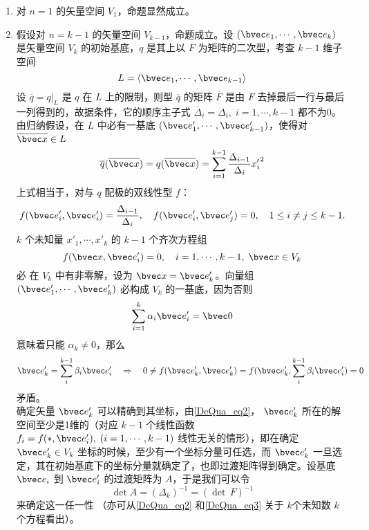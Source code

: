 \begin{enumerate}
\item 对 $n=1$ 的矢量空间 $V_1$，命题显然成立。
\item 假设对 $n=k-1$ 的矢量空间 $V_{k-1}$，命题成立。设 $(\bvec e_1,\cdots,\bvec e_k)$ 是矢量空间 $V_k$ 的初始基底，$q$ 是其上以 $F$ 为矩阵的二次型，考查 $k-1$ 维子空间
\begin{equation}
L=\langle\bvec e_1,\cdots,\bvec e_{k-1}\rangle
\end{equation}
设 $\overline q=q|_L$ 是 $q$ 在 $L$ 上的限制，则型 $\overline q$ 的矩阵 $\overline F$ 是由 $F$ 去掉最后一行与最后一列得到的，故据条件，它的顺序主子式 $\overline\Delta_i=\Delta_i,\;i=1,\cdots,k-1$ 都不为0。由归纳假设，在 $L$ 中必有一基底 $(\bvec e'_1,\cdots,\bvec e'_{k-1})$，使得对 $\overline{\bvec x}\in L$
\begin{equation}
\overline q(\overline{\bvec x})=q(\overline{\bvec x})=\sum_{i=1}^{k-1}\frac{\Delta_{i-1}}{\Delta_i}{x'_{i}}^2
\end{equation}
上式相当于，对与 $q$ 配极的双线性型 $f$：
\begin{equation}
f(\bvec e'_i,\bvec e'_i)=\frac{\Delta_{i-1}}{\Delta_{i}},\quad f(\bvec e'_i,\bvec e'_j)=0,\quad 1\leq i\neq j\leq k-1.
\end{equation}
 $k$ 个未知量 $x'_1,\cdots,x'_k$ 的 $k-1$ 个齐次方程组
 \begin{equation}\label{DeQua_eq2}
 f(\bvec x,\bvec e'_i)=0,\quad i=1,\cdots,k-1,\;\bvec x\in V_k
 \end{equation}
 必 在 $V_k$ 中有非零解，设为 $\bvec x=\bvec e'_k$。向量组 $(\bvec e'_1,\cdots,\bvec e'_k)$ 必构成 $V_k$ 的一基底，因为否则
 \begin{equation}
 \sum_{i=1}^k\alpha_i\bvec e'_i=\bvec 0
 \end{equation}
 意味着只能 $\alpha_k\neq0$，那么 
 \begin{equation}
 \bvec e'_k=\sum_i^{k-1}\beta_i\bvec e'_i\quad
 \Rightarrow\quad 0\neq f(\bvec e'_k,\bvec e'_k)=f(\bvec e'_k,\sum_i^{k-1}\beta_i\bvec e'_i)=0
 \end{equation}
 矛盾。\\

 确定矢量 $\bvec e'_k$ 可以精确到其坐标，由\autoref{DeQua_eq2}， $\bvec e'_k$ 所在的解空间至少是1维的（对应 $k-1$ 个线性函数 $f_i=f(*,\bvec e'_i),\;(i=1,\cdots,k-1)$ 线性无关的情形），即在确定 $\bvec e'_k\in V_k$ 坐标的时候，至少有一个坐标分量可任选，而 $\bvec e'_k$ 一旦选定，其在初始基底下的坐标分量就确定了，也即过渡矩阵得到确定。设基底 $\bvec e_i$ 到 $\bvec e'_i$ 的过渡矩阵为 $A$，于是我们可以令
 \begin{equation}\label{DeQua_eq3}
 \det A=(\Delta_k)^{-1}=(\det\,F)^{-1}
 \end{equation}
 来确定这一任一性 （亦可从\autoref{DeQua_eq2} 和\autoref{DeQua_eq3} 关于 $k$个未知数 $k$ 个方程看出）。


\end{enumerate}
